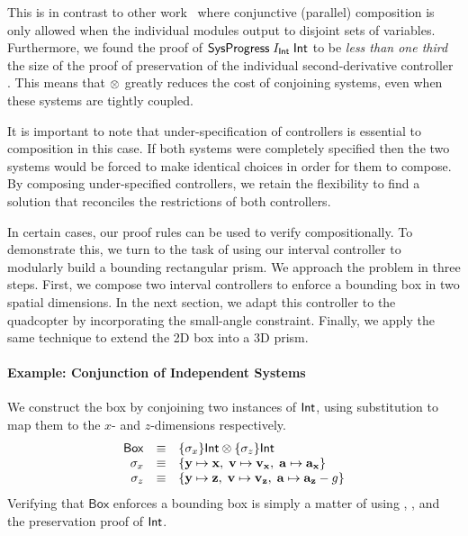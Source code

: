 This is in contrast to other work~\cite{alur1997modularity} where
conjunctive (parallel) composition is only allowed when the individual
modules output to disjoint sets of variables.  Furthermore, we found the
proof of $\mathsf{SysProgress{}}\;I_{{\mathsf{Int}}}\;{\mathsf{Int}}$ to
be \emph{less than one third} the size of the proof of preservation of the
individual second-derivative controller \derivShimx.  This means that
$\otimes$ greatly reduces the cost of conjoining systems, even when
these systems are tightly coupled.

It is important to note that under-specification of controllers is
essential to composition in this case.  If both systems were completely
specified then the two systems would be forced to make identical choices in
order for them to compose.  By composing under-specified controllers, we
retain the flexibility to find a solution that reconciles the restrictions
of both controllers.

In certain cases, our proof rules can be used to verify \progress{}
compositionally.  To demonstrate this, we turn to the task of using our
interval controller to modularly build a bounding rectangular prism.  We
approach the problem in three steps.  First, we compose two interval
controllers to enforce a bounding box in two spatial dimensions.  In the
next section, we adapt this controller to the quadcopter by incorporating
the small-angle constraint.  Finally, we apply the same technique to extend
the 2D box into a 3D prism.

\paragraph*{Example: Conjunction of Independent Systems}
We construct the box by conjoining two instances of ${\mathsf{Int}}$, using
substitution to map them to the $x$- and $z$-dimensions respectively.
\[\begin{array}{rcl}
\mathsf{Box} & \equiv & \{\sigma_x\}{\mathsf{Int}} \otimes \{\sigma_z\}{\mathsf{Int}} \\
\sigma_x &\equiv &\{ \mathbf{y} \mapsto \mathbf{x} ,\; \mathbf{v} \mapsto \mathbf{v_x} ,\; \mathbf{a} \mapsto \mathbf{a_x} \} \\
\sigma_z &\equiv & \{ \mathbf{y} \mapsto \mathbf{z} ,\; \mathbf{v} \mapsto \mathbf{v_z} ,\; \mathbf{a} \mapsto \mathbf{a_z} - g \}
\end{array}
\]
Verifying that $\mathsf{Box}$ enforces a bounding box is simply a matter of
using , , and the
preservation proof of ${\mathsf{Int}}$.

